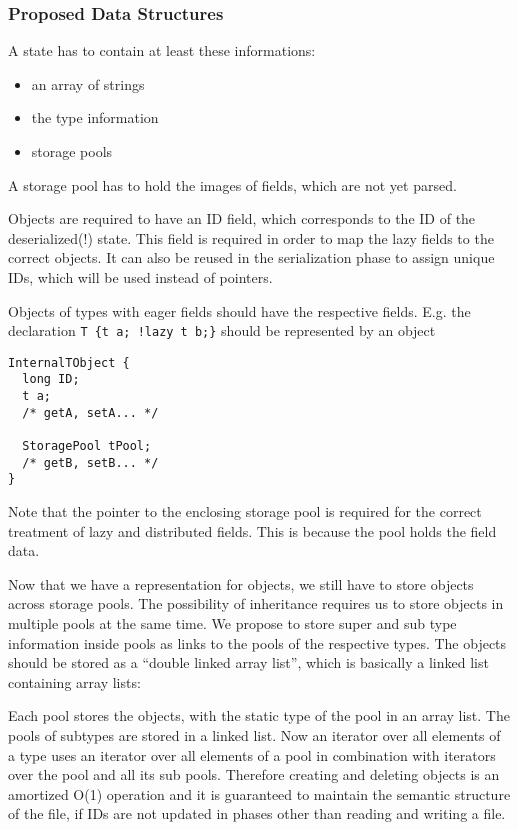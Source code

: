 \subsubsection{Proposed Data Structures}

A state has to contain at least these informations:
\begin{itemize}
 \item an array of strings
 \item the type information
 \item storage pools
\end{itemize}

A storage pool has to hold the images of fields, which are not yet parsed.

Objects are required to have an ID field, which corresponds to the ID of the deserialized(!) state. This field is required in order to map the lazy fields to the correct objects. It can also be reused in the serialization phase to assign unique IDs, which will be used instead of pointers.

Objects of types with eager fields should have the respective fields. E.g. the declaration \verb/T {t a; !lazy t b;}/ should be represented by an object
\begin{verbatim}
InternalTObject { 
  long ID;
  t a;
  /* getA, setA... */
  
  StoragePool tPool;
  /* getB, setB... */
}
\end{verbatim}

Note that the pointer to the enclosing storage pool is required for the correct treatment of lazy and distributed fields. This is because the pool holds the field data.


Now that we have a representation for objects, we still have to store objects across storage pools. The possibility of inheritance requires us to store objects in multiple pools at the same time.
We propose to store super and sub type information inside pools as links to the pools of the respective types. The objects should be stored as a ``double linked array list'', which is basically a linked list containing array lists:

Each pool stores the objects, with the static type of the pool in an array list. The pools of subtypes are stored in a linked list. Now an iterator over all elements of a type uses an iterator over all elements of a pool in combination with iterators over the pool and all its sub pools. Therefore creating and deleting objects is an amortized O(1) operation and it is guaranteed to maintain the semantic structure of the file, if IDs are not updated in phases other than reading and writing a file.

